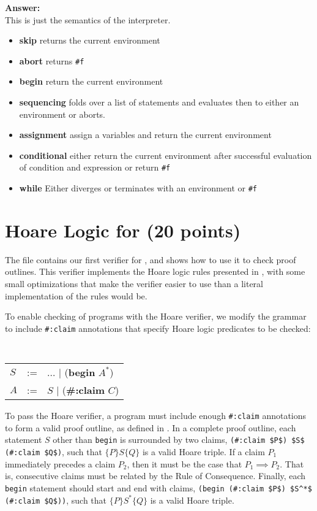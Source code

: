 \documentclass{handout}
\begin{document}
\begin{questions}
  \textbf{Answer:}\\
  
This is just the semantics of the interpreter.

\begin{itemize}
    \item \textbf{skip}  returns the current environment
    \item \textbf{abort} returns \lstinline{#f}
    \item \textbf{begin} return the current environment
    \item \textbf{sequencing} folds over a list of statements and evaluates then to either an environment or aborts. 
    \item \textbf{assignment} assign a variables and return the current environment
    \item \textbf{conditional} either return the current environment after successful evaluation of condition and expression or return \lstinline{#f}
    \item \textbf{while} Either diverges or terminates with an environment or \lstinline{#f}
\end{itemize}
  
\end{questions}

\section{Hoare Logic for \imp (20 points)}\label{sec:imp:hoare}

The file  contains our first verifier for \imp, and
 shows how to use it to check proof outlines. This
verifier implements the Hoare logic rules presented in , with some
small optimizations that make the verifier easier to use than a literal
implementation of the rules would be.

To enable checking of \imp programs with the Hoare verifier, we modify the \imp
grammar to include \lstinline{#:claim} annotations that specify Hoare logic
predicates to be checked:

{\tt\small
\begin{tabular}{lcl}
$S$ &:=&  $\ldots$ $|$ (\textbf{begin} $A^*$)  \\
$A$ &:=&  $S$ $|$ (\textbf{\#:claim} $C$)\\
\end{tabular}}

To pass the Hoare verifier, a program must include enough \lstinline{#:claim}
annotations to form a valid proof outline, as defined in . In a
complete proof outline, each statement $S$ other than \lstinline{begin} is
surrounded by two claims, \lstinline{(#:claim $P$) $S$ (#:claim $Q$)}, such that
$\{P\}S\{Q\}$ is a valid Hoare triple. If a claim $P_1$ immediately precedes a
claim $P_2$, then it must be the case that $P_1 \implies P_2$. That is,
consecutive claims must be related by the Rule of Consequence. Finally, each
\lstinline{begin} statement should start and end with claims,
\lstinline{(begin (#:claim $P$) $S^*$ (#:claim $Q$))}, such that
$\{P\}S^*\{Q\}$ is a valid Hoare triple.
\end{document}

